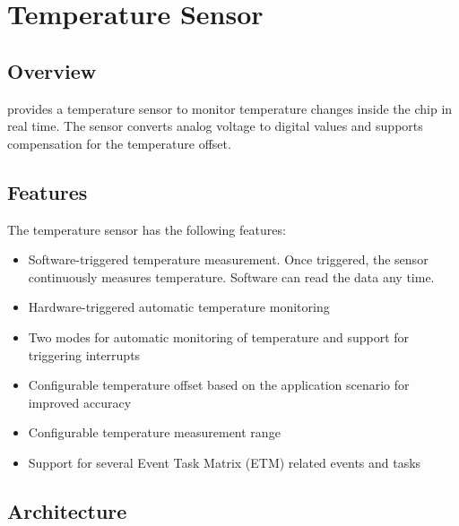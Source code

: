\documentclass[main\_\_EN.tex]{subfiles}
\begin{document}

\ifglobal
\else
    \listoftodos
    {\let\clearpage\relax \listofdonetodos}
    \tableofcontents
\fi



\hypertarget{tmpsen}{}
\chapter{Temperature Sensor}
\label{mod:tmpsen}


\section{Overview}

\chipname{} provides a temperature sensor to monitor temperature changes inside the chip in real time. The sensor converts analog voltage to digital values and supports compensation for the temperature offset.

\section{Features}

The temperature sensor has the following features:

\begin{itemize}
    \item Software-triggered temperature measurement. Once triggered, the sensor continuously measures temperature. Software can read the data any time.
    \item Hardware-triggered automatic temperature monitoring
    \item Two modes for automatic monitoring of temperature and support for triggering interrupts
    \item Configurable temperature offset based on the application scenario for improved accuracy
    \item Configurable temperature measurement range
\item Support for several Event Task Matrix (ETM) related events and tasks
\end{itemize}

\section{Architecture}
\end{document}
